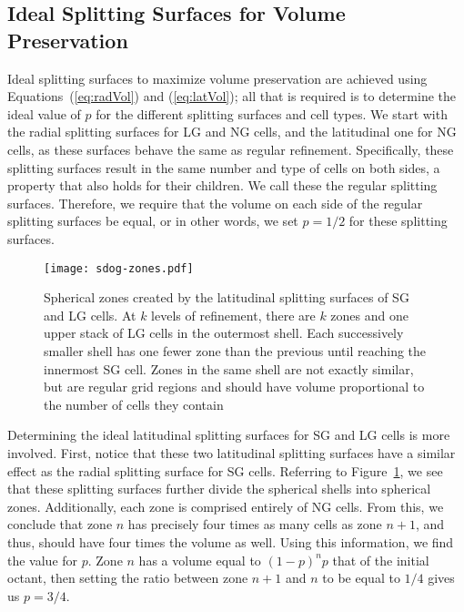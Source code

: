 \subsection{Ideal Splitting Surfaces for Volume Preservation} \label{chap:4:ideal}
Ideal splitting surfaces to maximize volume preservation are achieved using Equations~(\ref{eq:radVol}) and (\ref{eq:latVol}); all that is required is to determine the ideal value of $p$ for the different splitting surfaces and cell types.
We start with the radial splitting surfaces for LG and NG cells, and the latitudinal one for NG cells, as these surfaces behave the same as regular refinement.
Specifically, these splitting surfaces result in the same number and type of cells on both sides, a property that also holds for their children.
We call these the regular splitting surfaces.
Therefore, we require that the volume on each side of the regular splitting surfaces be equal, or in other words, we set $p = 1/2$ for these splitting surfaces.


\begin{figure}[ht!]
	\centering
	\texttt{[image: sdog-zones.pdf]}
	\caption[Spherical zones that result from SDOG refinement]{
		Spherical zones created by the latitudinal splitting surfaces of SG and LG cells.
		At $k$ levels of refinement, there are $k$ zones and one upper stack of LG cells in the outermost shell.
		Each successively smaller shell has one fewer zone than the previous until reaching the innermost SG cell.
		Zones in the same shell are not exactly similar, but are regular grid regions and should have volume proportional to the number of cells they contain
	}
	\label{fig:sdog-zones}
\end{figure}


Determining the ideal latitudinal splitting surfaces for SG and LG cells is more involved.
First, notice that these two latitudinal splitting surfaces have a similar effect as the radial splitting surface for SG cells.
Referring to Figure~\ref{fig:sdog-zones}, we see that these splitting surfaces further divide the spherical shells into spherical zones.
Additionally, each zone is comprised entirely of NG cells.
From this, we conclude that zone $n$ has precisely four times as many cells as zone $n+1$, and thus, should have four times the volume as well.
Using this information, we find the value for $p$.
Zone $n$ has a volume equal to $\left( 1 - p \right)^{n} p$ that of the initial octant, then setting the ratio between zone $n+1$ and $n$ to be equal to $1/4$ gives us $p = 3/4$.


